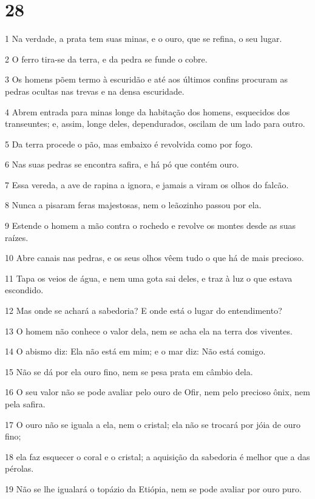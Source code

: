 \chapter{28}

\par 1 Na verdade, a prata tem suas minas, e o ouro, que se refina, o seu lugar.
\par 2 O ferro tira-se da terra, e da pedra se funde o cobre.
\par 3 Os homens põem termo à escuridão e até aos últimos confins procuram as pedras ocultas nas trevas e na densa escuridade.
\par 4 Abrem entrada para minas longe da habitação dos homens, esquecidos dos transeuntes; e, assim, longe deles, dependurados, oscilam de um lado para outro.
\par 5 Da terra procede o pão, mas embaixo é revolvida como por fogo.
\par 6 Nas suas pedras se encontra safira, e há pó que contém ouro.
\par 7 Essa vereda, a ave de rapina a ignora, e jamais a viram os olhos do falcão.
\par 8 Nunca a pisaram feras majestosas, nem o leãozinho passou por ela.
\par 9 Estende o homem a mão contra o rochedo e revolve os montes desde as suas raízes.
\par 10 Abre canais nas pedras, e os seus olhos vêem tudo o que há de mais precioso.
\par 11 Tapa os veios de água, e nem uma gota sai deles, e traz à luz o que estava escondido.
\par 12 Mas onde se achará a sabedoria? E onde está o lugar do entendimento?
\par 13 O homem não conhece o valor dela, nem se acha ela na terra dos viventes.
\par 14 O abismo diz: Ela não está em mim; e o mar diz: Não está comigo.
\par 15 Não se dá por ela ouro fino, nem se pesa prata em câmbio dela.
\par 16 O seu valor não se pode avaliar pelo ouro de Ofir, nem pelo precioso ônix, nem pela safira.
\par 17 O ouro não se iguala a ela, nem o cristal; ela não se trocará por jóia de ouro fino;
\par 18 ela faz esquecer o coral e o cristal; a aquisição da sabedoria é melhor que a das pérolas.
\par 19 Não se lhe igualará o topázio da Etiópia, nem se pode avaliar por ouro puro.
